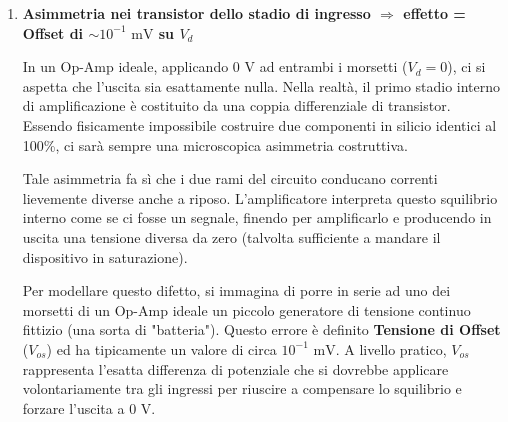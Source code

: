 \begin{enumerate}[label=\textbf{\arabic*.}, leftmargin=*, itemsep=0.4cm, topsep=0.3cm]
    \begin{figure}[H]
        \centering
        \caption{Effetto dello slew-rate: a fronte di una variazione istantanea a gradino (in grigio), l'uscita (in verde) non potendo variare istantaneamente si adegua con una pendenza limitata, assumendo una caratteristica forma trapezoidale.}
    \end{figure}

    \item \textbf{Asimmetria nei transistor dello stadio di ingresso $\Rightarrow$ effetto = Offset di $\sim 10^{-1} \text{ mV}$ su $V_d$}

    In un Op-Amp ideale, applicando $0\text{ V}$ ad entrambi i morsetti ($V_d = 0$), ci si aspetta che l'uscita sia esattamente nulla. Nella realtà, il primo stadio interno di amplificazione è costituito da una coppia differenziale di transistor. Essendo fisicamente impossibile costruire due componenti in silicio identici al 100\%, ci sarà sempre una microscopica asimmetria costruttiva.

    Tale asimmetria fa sì che i due rami del circuito conducano correnti lievemente diverse anche a riposo. L'amplificatore interpreta questo squilibrio interno come se ci fosse un segnale, finendo per amplificarlo e producendo in uscita una tensione diversa da zero (talvolta sufficiente a mandare il dispositivo in saturazione).

    Per modellare questo difetto, si immagina di porre in serie ad uno dei morsetti di un Op-Amp ideale un piccolo generatore di tensione continuo fittizio (una sorta di "batteria"). Questo errore è definito \textbf{Tensione di Offset} ($V_{os}$) ed ha tipicamente un valore di circa $10^{-1}\text{ mV}$. A livello pratico, $V_{os}$ rappresenta l'esatta differenza di potenziale che si dovrebbe applicare volontariamente tra gli ingressi per riuscire a compensare lo squilibrio e forzare l'uscita a $0\text{ V}$.

\end{enumerate}

